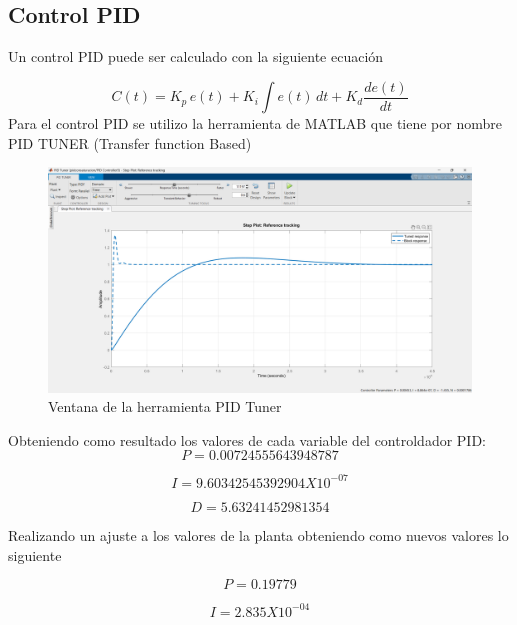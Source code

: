 \documentclass[12pt]{article}
\begin{document}
	\subsection{Control PID}
	
	
	
	Un control PID puede ser calculado con la siguiente ecuación 
	
	\begin{equation}
		C(t) = K_p \, e(t) + K_i \int e(t) \, dt + K_d \frac{d e(t)}{dt}
	\end{equation}
	Para el control PID se utilizo la herramienta de MATLAB que tiene por nombre PID TUNER (Transfer function Based)
	
	\begin{figure}[h!]
		\centering
		\includegraphics[width=0.7\linewidth]{imagenes/pid tuner}
		\caption{Ventana de la herramienta PID Tuner}
		\label{fig:pid-tuner}
	\end{figure}
	
	Obteniendo como resultado los valores de cada variable del controldador PID:
	\begin{equation}
		P=0.00724555643948787 
	\end{equation}
	
	\begin{equation}
		I=9.60342545392904 X 10^{-07}
	\end{equation}
	
	\begin{equation}
		D=5.63241452981354
	\end{equation}
	
	Realizando un ajuste a los valores de la planta obteniendo como nuevos valores lo siguiente
	
	\begin{equation}
		P=0.19779
	\end{equation}
	
	\begin{equation}
		I=2.835 X 10^{-04}
	\end{equation}
	
\end{document}
